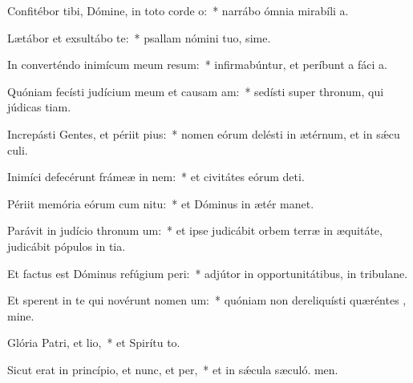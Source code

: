 \item Confitébor tibi, Dómine, in toto corde o:~* narrábo ómnia mirabíli a.
\item Lætábor et exsultábo  te:~* psallam nómini tuo, sime.
\item In converténdo inimícum meum resum:~* infirmabúntur, et períbunt a fáci a.
\item Quóniam fecísti judícium meum et causam am:~* sedísti super thronum, qui júdicas tiam.
\item Increpásti Gentes, et périit pius:~* nomen eórum delésti in ætérnum, et in sǽcu culi.
\item Inimíci defecérunt frámeæ in nem:~* et civitátes eórum deti.
\item Périit memória eórum cum nitu:~* et Dóminus in ætér manet.
\item Parávit in judício thronum um:~* et ipse judicábit orbem terræ in æquitáte, judicábit pópulos in tia.
\item Et factus est Dóminus refúgium peri:~* adjútor in opportunitátibus, in tribulane.
\item Et sperent in te qui novérunt nomen um:~* quóniam non dereliquísti quæréntes , mine.
\item Glória Patri, et lio,~* et Spirítu to.
\item Sicut erat in princípio, et nunc, et per,~* et in sǽcula sæculó. men.
